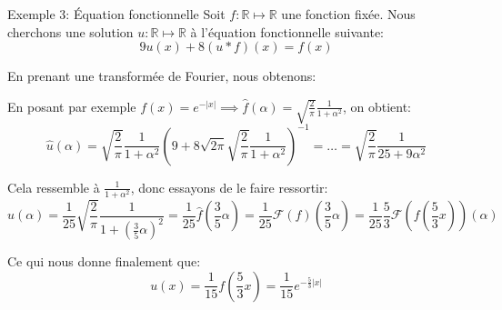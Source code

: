 \documentclass[a4paper]{article}
\begin{document}
\begin{parag}{Exemple 3: Équation fonctionnelle}
    Soit $f: \mathbb{R} \mapsto \mathbb{R}$ une fonction fixée. Nous cherchons une solution $u: \mathbb{R} \mapsto \mathbb{R}$ à l'équation fonctionnelle suivante: 
    \[9 u\left(x\right) + 8\left(u* f\right)\left(x\right) = f\left(x\right)\]
    
    En prenant une transformée de Fourier, nous obtenons: 
    
    En posant par exemple $f\left(x\right) = e^{-\left|x\right|} \implies \hat{f}\left(\alpha\right) = \sqrt{\frac{2}{\pi}} \frac{1}{1 + \alpha ^2}$, on obtient: 
    \[\hat{u}\left(\alpha\right) = \sqrt{\frac{2}{\pi}} \frac{1}{1 + \alpha ^2} \left(9 + 8\sqrt{2\pi} \sqrt{\frac{2}{\pi}} \frac{1}{1 + \alpha ^2}\right)^{-1} = \ldots = \sqrt{\frac{2}{\pi}} \frac{1}{25 + 9 \alpha ^2}\]
    
    Cela ressemble à $\frac{1}{1 + \alpha ^2}$, donc essayons de le faire ressortir: 
    \[\hat{u}\left(\alpha\right) = \frac{1}{25} \sqrt{\frac{2}{\pi}} \frac{1}{1 + \left(\frac{3}{5} \alpha\right)^2} = \frac{1}{25} \hat{f}\left(\frac{3}{5}\alpha\right) = \frac{1}{25} \mathcal{F}\left(f\right)\left(\frac{3}{5} \alpha\right) = \frac{1}{25} \frac{5}{3} \mathcal{F}\left(f\left(\frac{5}{3}x\right)\right)\left(\alpha\right)\]

    Ce qui nous donne finalement que: 
    \[u\left(x\right) = \frac{1}{15} f\left(\frac{5}{3}x\right) = \frac{1}{15} e^{-\frac{5}{3}\left|x\right|}\]
\end{parag}
\end{document}
